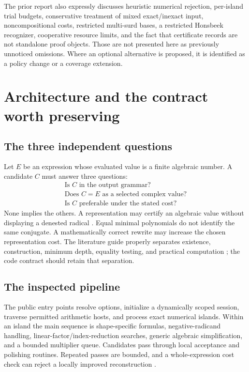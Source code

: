 \documentclass[11pt,letterpaper]{article}
\numberwithin{equation}{section}
\theoremstyle{definition}\newtheorem{definition}[theorem]{Definition}
\theoremstyle{remark}\newtheorem{remark}[theorem]{Remark}
\newcommand{\code}[1]{\texttt{\detokenize{#1}}}
\begin{document}
The prior report also expressly discusses heuristic numerical rejection, per-island trial budgets, conservative treatment of mixed exact/inexact input, noncompositional costs, restricted multi-surd bases, a restricted Honsbeek recognizer, cooperative resource limits, and the fact that certificate records are not standalone proof objects. Those are not presented here as previously unnoticed omissions. Where an optional alternative is proposed, it is identified as a policy change or a coverage extension.

\section{Architecture and the contract worth preserving}
\subsection{The three independent questions}
Let $E$ be an expression whose evaluated value is a finite algebraic number. A candidate $C$ must answer three questions:
\begin{equation}
\begin{gathered}
\text{Is $C$ in the output grammar?}\\
\text{Does $C=E$ as a selected complex value?}\\
\text{Is $C$ preferable under the stated cost?}
\end{gathered}
\end{equation}
None implies the others. A \code{Root} representation may certify an algebraic value without displaying a denested radical \cite{wl-rootreduce}. Equal minimal polynomials do not identify the same conjugate. A mathematically correct rewrite may increase the chosen representation cost. The literature guide properly separates existence, construction, minimum depth, equality testing, and practical computation \cite{guide}; the code contract should retain that separation.

\subsection{The inspected pipeline}
The public entry points resolve options, initialize a dynamically scoped session, traverse permitted arithmetic hosts, and process exact numerical islands. Within an island the main sequence is shape-specific formulas, negative-radicand handling, linear-factor/index-reduction searches, generic algebraic simplification, and a bounded multiplier queue. Candidates pass through local acceptance and polishing routines. Repeated passes are bounded, and a whole-expression cost check can reject a locally improved reconstruction \cite{source}.
\end{document}
